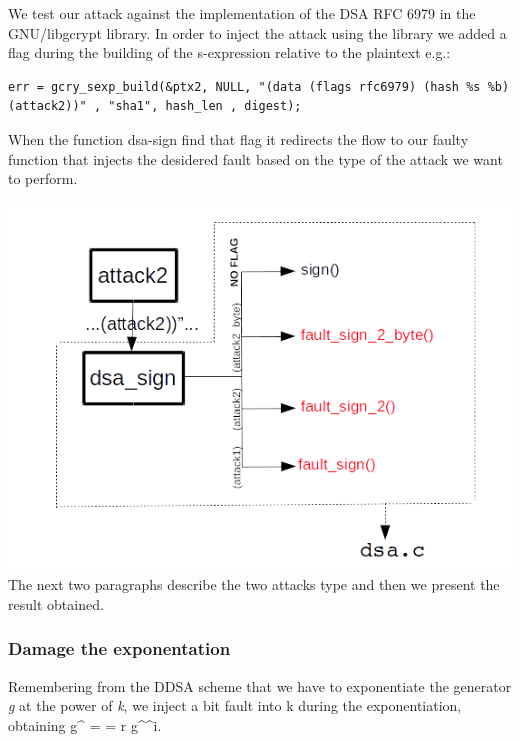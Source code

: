 \documentclass[11pt,english]{article}
\begin{document}
We test our attack against the implementation of the DSA RFC 6979 in the GNU/libgcrypt\cite{lib} library. 
In order to inject the attack using the library we added a flag during the building of the s-expression relative to the plaintext e.g.:

\begin{lstlisting}
err = gcry_sexp_build(&ptx2, NULL, "(data (flags rfc6979) (hash %s %b) (attack2))" , "sha1", hash_len , digest);
\end{lstlisting}

When the function dsa-sign find that flag it redirects the flow to our faulty function that injects the desidered fault based on the type of the attack we want to perform.

\includegraphics[width=1.0\textwidth]{img/img_3.png} \\

The next two paragraphs describe the two attacks type and then we present the result obtained.

\subsubsection{Damage the exponentation}

Remembering from the DDSA scheme that we have to exponentiate the generator \textit{g} at the power of \textit{k}, we inject a bit fault into k during the exponentiation, obtaining g^{} =  = r \cdot g^{^{i}}.
\end{document}
